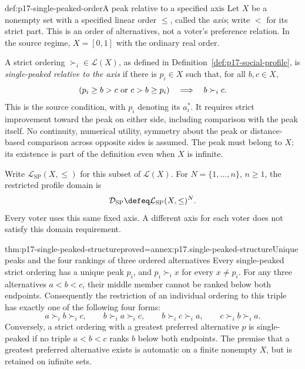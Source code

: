 \begin{hbdefinition}{def:p17-single-peaked-order}{A peak relative to a specified axis}
Let \(X\) be a nonempty set with a specified linear order \(\leq\),
called the \emph{axis}; write \(<\) for its strict part. This is an
order of alternatives, not a voter's preference relation. In the source
regime, \(X=[0,1]\) with the ordinary real order.

A strict ordering \(\succ_i\in\mathcal L(X)\), as defined in
Definition~\ref{def:p17-social-profile}, is \emph{single-peaked relative
to the axis} if there is \(p_i\in X\) such that, for all \(b,c\in X\),
\[
 (p_i\geq b>c\ \hbox{or}\ c>b\geq p_i)
                 \quad\Longrightarrow\quad b\succ_i c.
\]
This is the source condition, with \(p_i\) denoting its \(a_i^*\).
It requires strict improvement toward the peak on either side, including
comparison with the peak itself. No continuity, numerical utility,
symmetry about the peak or distance-based comparison across opposite
sides is assumed. The peak must belong to \(X\); its existence is part
of the definition even when \(X\) is infinite.

Write \(\mathcal L_{\mathrm{SP}}(X,\leq)\) for this subset of
\(\mathcal L(X)\). For \(N=\{1,\ldots,n\}\), \(n\geq1\), the
restricted profile domain is
\[
 \mathcal D_{\mathrm{SP}}\defeq
                   \mathcal L_{\mathrm{SP}}(X,\leq)^N.
\]
Every voter uses this same fixed axis. A different axis for each voter
does not satisfy this domain requirement.
\end{hbdefinition}

\begin{hblemma}{thm:p17-single-peaked-structure}{proved=annex:p17.single-peaked-structure}{Unique peaks and the four rankings of three ordered alternatives}
Every single-peaked strict ordering has a unique peak \(p_i\), and
\(p_i\succ_i x\) for every \(x\ne p_i\). For any three alternatives
\(a<b<c\), their middle member cannot be ranked below both endpoints.
Consequently the restriction of an individual ordering to this triple
has exactly one of the following four forms:
\[
 a\succ_i b\succ_i c,\qquad
 b\succ_i a\succ_i c,\qquad
 b\succ_i c\succ_i a,\qquad
 c\succ_i b\succ_i a.
\]
Conversely, a strict ordering with a greatest preferred alternative \(p\)
is single-peaked if no triple \(a<b<c\) ranks \(b\) below both
endpoints. The premise that a greatest preferred alternative exists is
automatic on a finite nonempty \(X\), but is retained on infinite sets.
\end{hblemma}

